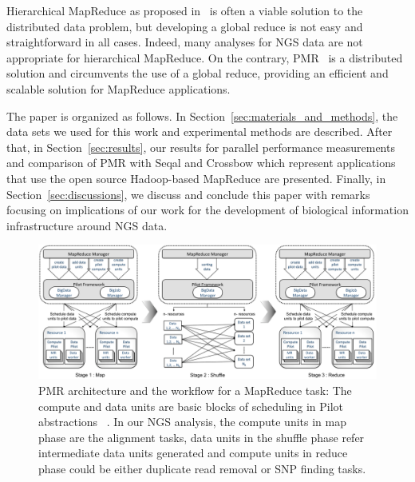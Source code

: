 \documentclass{acm_proc_article-sp}
\begin{document}
Hierarchical MapReduce as proposed in~\cite{ecmls11-mr-autodock} is
often a viable solution to the distributed data problem, but
developing a global reduce is not easy and straightforward in all
cases. Indeed, many analyses for NGS data are not appropriate for hierarchical MapReduce. 
On the contrary, PMR~\cite{pmr2012} is a distributed solution and
circumvents the use of a global reduce, providing an efficient and scalable solution for MapReduce applications. 

The paper is organized as follows. In
Section~\ref{sec:materials_and_methods}, the data sets we used for
this work and experimental methods are described.
After that, in Section~\ref{sec:results}, our results for parallel performance
measurements and comparison of PMR with Seqal and Crossbow
which represent applications that use the open source Hadoop-based
MapReduce\cite{hadoop-url, taylor2010,seal_2011_mapred,seal2011} are
presented.  Finally, in Section~\ref{sec:discussions}, we 
discuss and conclude this paper with remarks focusing on
implications of our work for the development of biological
information infrastructure around NGS data.  

\begin{center}
\hfill{}
\begin{figure}
 \centering
\includegraphics[scale=0.35]{figures/F1_1.pdf} 
\hfill{}
\caption{\small PMR architecture and the workflow for a MapReduce task: The compute and data units are basic blocks of scheduling in Pilot abstractions ~\cite{pstar11}. In our NGS analysis, the compute units in map phase are the alignment tasks, data units in the shuffle phase refer intermediate data units generated and compute units in reduce phase could be either duplicate read removal or SNP finding tasks.}
  \label{fig:arch-pj-saga-mr} 
\end{figure}
\end{center}
\end{document}
